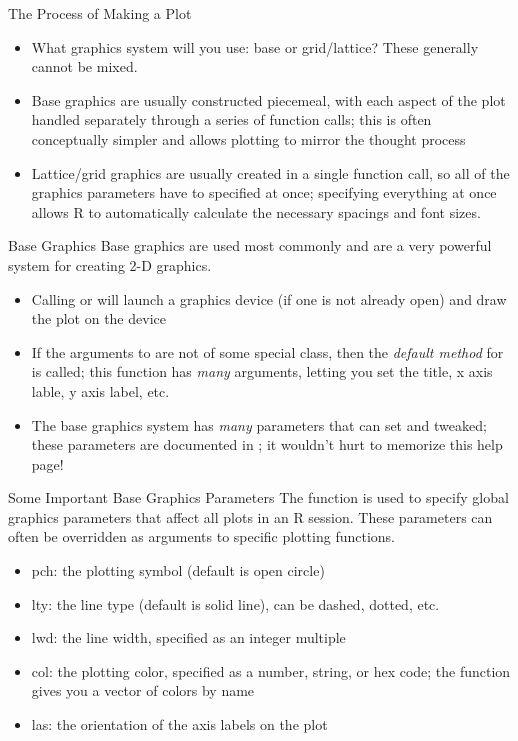 \documentclass[aspectratio=169]{beamer}
\begin{document}
\begin{frame}{The Process of Making a Plot}
\begin{itemize}
\item
What graphics system will you use: base or grid/lattice?  These
generally cannot be mixed.
\item
Base graphics are usually constructed piecemeal, with each aspect of
the plot handled separately through a series of function calls; this
is often conceptually simpler and allows plotting to mirror the
thought process
\item
Lattice/grid graphics are usually created in a single function call,
so all of the graphics parameters have to specified at once;
specifying everything at once allows R to automatically calculate the
necessary spacings and font sizes.
\end{itemize}
\end{frame}


\begin{frame}{Base Graphics}
Base graphics are used most commonly and are a very powerful system
for creating 2-D graphics.  
\begin{itemize}
\item
Calling  or  will launch a graphics
device (if one is not already open) and draw the plot on the device
\item
If the arguments to  are not of some special class, then
the \textit{default method} for  is called; this function
has \textit{many} arguments, letting you set the title, x axis lable,
y axis label, etc.
\item
The base graphics system has \textit{many} parameters that can set and
tweaked; these parameters are documented in ; it wouldn't
hurt to memorize this help page!
\end{itemize}
\end{frame}

\begin{frame}{Some Important Base Graphics Parameters}
The  function is used to specify global graphics parameters
that affect all plots in an R session.  These parameters can often be
overridden as arguments to specific plotting functions.
\begin{itemize}
\item
pch:  the plotting symbol (default is open circle)
\item
lty: the line type (default is solid line), can be dashed, dotted,
etc.
\item
lwd: the line width, specified as an integer multiple
\item
col: the plotting color, specified as a number, string, or hex code;
the  function gives you a vector of colors by name
\item
las: the orientation of the axis labels on the plot
\end{itemize}
\end{frame}
\end{document}
